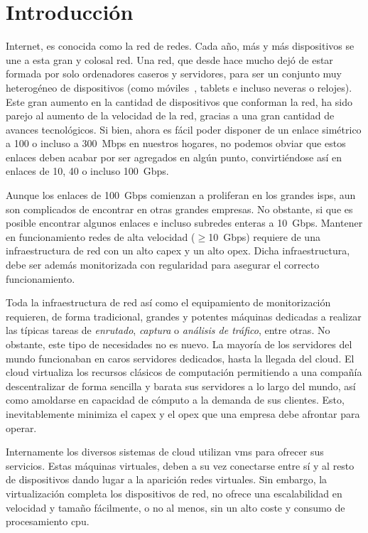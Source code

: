 \chapter{Introducción}

Internet, es conocida como la red de redes. Cada año, más y más dispositivos se une a esta gran y colosal red. Una red, que desde hace mucho dejó de estar formada por solo ordenadores caseros y servidores, para ser un conjunto muy heterogéneo de dispositivos (como móviles~\cite{bib:introduccion:smartphone}, tablets e incluso neveras o relojes). Este gran aumento en la cantidad de dispositivos que conforman la red, ha sido parejo al aumento de la velocidad de la red, gracias a una gran cantidad de avances tecnológicos. Si bien, ahora es fácil poder disponer de un enlace simétrico a 100 o incluso a 300~Mbps en nuestros hogares, no podemos obviar que estos enlaces deben acabar por ser agregados en algún punto, convirtiéndose así en enlaces de 10, 40 o incluso 100~Gbps.

Aunque los enlaces de 100~Gbps comienzan a proliferan en los grandes \glspl{isp}, aun son complicados de encontrar en otras grandes empresas. No obstante, si que es posible encontrar algunos enlaces e incluso subredes enteras a 10~Gbps. Mantener en funcionamiento redes de alta velocidad ($\geq$10~Gbps) requiere de una infraestructura de red con un alto \gls{capex} y un alto \gls{opex}. Dicha infraestructura, debe ser además monitorizada con regularidad para asegurar el correcto funcionamiento.

Toda la infraestructura de red así como el equipamiento de monitorización requieren, de forma tradicional, grandes y potentes máquinas dedicadas a realizar las típicas tareas de \textit{enrutado}, \textit{captura} o \textit{análisis de tráfico}, entre otras. No obstante, este tipo de necesidades no es nuevo. La mayoría de los servidores del mundo funcionaban en caros servidores dedicados, hasta la llegada del \gls{cloud}. El \gls{cloud} virtualiza los recursos clásicos de computación permitiendo a una compañía descentralizar de forma sencilla y barata sus servidores a lo largo del mundo, así como amoldarse en capacidad de cómputo a la demanda de sus clientes. Esto, inevitablemente minimiza el \gls{capex} y el \gls{opex} que una empresa debe afrontar para operar.

Internamente los diversos sistemas de \gls{cloud} utilizan \glspl{vm} para ofrecer sus servicios. Estas máquinas virtuales, deben a su vez conectarse entre sí y al resto de dispositivos dando lugar a la aparición redes virtuales. Sin embargo, la virtualización completa los dispositivos de red, no ofrece una escalabilidad en velocidad y tamaño fácilmente, o no al menos, sin un alto coste y consumo de procesamiento \gls{cpu}.


